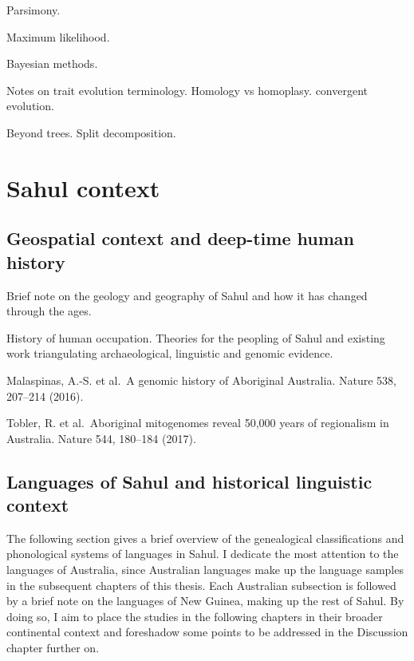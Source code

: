 Parsimony.

Maximum likelihood.

Bayesian methods.

Notes on trait evolution terminology. Homology vs homoplasy. convergent evolution.

Beyond trees. Split decomposition.

\hypertarget{sahul-context}{%
\section{Sahul context}\label{sahul-context}}

\hypertarget{geospatial-context-and-deep-time-human-history}{%
\subsection{Geospatial context and deep-time human history}\label{geospatial-context-and-deep-time-human-history}}

Brief note on the geology and geography of Sahul and how it has changed through the ages.

History of human occupation. Theories for the peopling of Sahul and existing work triangulating archaeological, linguistic and genomic evidence.

Malaspinas, A.-S. et al.~A genomic history of Aboriginal Australia. Nature 538, 207--214 (2016).

Tobler, R. et al.~Aboriginal mitogenomes reveal 50,000 years of regionalism in Australia. Nature 544, 180--184 (2017).

\hypertarget{languages-of-sahul-and-historical-linguistic-context}{%
\subsection{Languages of Sahul and historical linguistic context}\label{languages-of-sahul-and-historical-linguistic-context}}

The following section gives a brief overview of the genealogical classifications and phonological systems of languages in Sahul. I dedicate the most attention to the languages of Australia, since Australian languages make up the language samples in the subsequent chapters of this thesis. Each Australian subsection is followed by a brief note on the languages of New Guinea, making up the rest of Sahul. By doing so, I aim to place the studies in the following chapters in their broader continental context and foreshadow some points to be addressed in the Discussion chapter further on.

